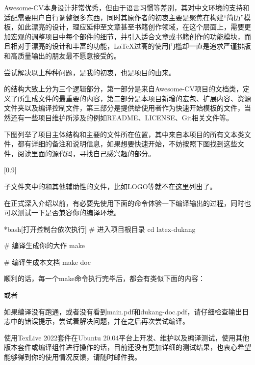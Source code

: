 Awesome-CV本身设计非常优秀，但由于语言习惯等差别，其对中文环境的支持和适配需要用户自行调整很多东西，同时其原作者的初衷主要是聚焦在构建“简历”模板，如此漂亮的设计，理应延伸至文章甚至书籍创作领域，在这个层面上，需要更加宏观的调整项目中每个部件的细节，并引入适合文章或书籍创作的功能模块，而且相对于漂亮的设计和丰富的功能，{\LaTeX}过高的使用门槛却一直是追求严谨排版和高质量输出的朋友最不愿意接受的。

尝试解决以上种种问题，是我的初衷，也是{\dk}项目的由来。

{\dk}的结构大致上分为三个逻辑部分，第一部分是来自Awesome-CV项目的文档类，定义了所生成文件的最重要的内容，第二部分是本项目新增的宏包、扩展内容、资源文件夹以及编译控制文件，第三部分是提供给使用者作为快速开始模板的文件，当然还有一些项目维护所涉及的例如README、LICENSE、Git相关文件等。

下图列举了项目主体结构和主要的文件所在位置，其中来自本项目的所有文本类文件，都有详细的备注和说明信息，如果想要{\color{awesome}快速开始}，不妨按照下图找到这些文件，阅读里面的源代码，寻找自己感兴趣的部分。

[0.9]

\begin{dkcomment}
  子文件夹中的和其他辅助性的文件，比如LOGO等就不在这里列出了。
\end{dkcomment}


在正式深入介绍以前，有必要先使用下面的命令体验一下编译输出的过程，同时也可以测试一下{\dk}是否兼容你的编译环境。

\begin{dkcode}*{bash}[打开控制台依次执行]
# 进入项目根目录
cd latex-dukang

# 编译生成你的大作
make

# 编译生成本文档
make doc
\end{dkcode}

顺利的话，每一个make命令执行完毕后，都会有类似下面的内容：

\begin{center}

  或者

\end{center}

如果编译没有跑通，或者没有看到main.pdf和dukang-doc.pdf，请仔细检查输出日志中的错误提示，尝试着解决问题，并在之后再次尝试编译。

\begin{dkcomment}[关于兼容性]
  {\hspace{2em}}{\dk}使用TexLive 2022套件在Ubuntu 20.04平台上开发、维护以及编译测试，使用其他版本套件或编译组件进行操作的话，目前还没有更加详细的测试结果，也衷心希望能够得到你的使用情况反馈，请随时邮件我。
\end{dkcomment}


\clearpage
